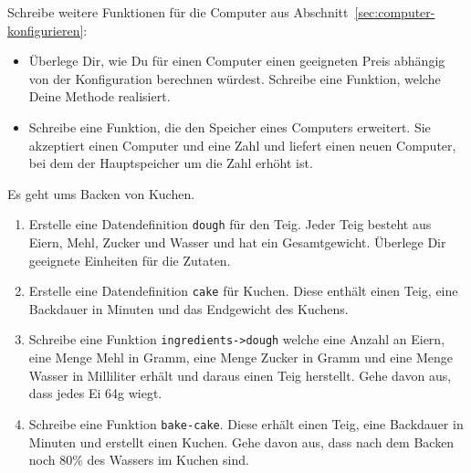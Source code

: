 \begin{aufgabe}

  Schreibe weitere Funktionen für die Computer aus Abschnitt~\ref{sec:computer-konfigurieren}:
  \begin{itemize}
  \item Überlege Dir, wie Du für einen Computer einen
    geeigneten Preis abhängig von der Konfiguration berechnen würdest.
    Schreibe eine Funktion, welche Deine Methode realisiert.
  \item Schreibe eine Funktion, die den Speicher eines Computers
    erweitert.  Sie akzeptiert einen Computer und eine Zahl und liefert
    einen neuen Computer, bei dem der Hauptspeicher um die Zahl erhöht
    ist.
  \end{itemize}
\end{aufgabe}

\begin{aufgabe}

  Es geht ums Backen von Kuchen.

  \begin{enumerate}
  \item Erstelle eine Datendefinition
    \lstinline{dough} für den Teig.  Jeder Teig besteht aus Eiern, Mehl,
    Zucker und Wasser und hat ein Gesamtgewicht.  Überlege Dir
    geeignete Einheiten für die Zutaten.
  \item Erstelle eine Datendefinition \lstinline{cake}
    für Kuchen.  Diese enthält einen Teig, eine Backdauer in Minuten und 
    das Endgewicht des Kuchens.
  \item Schreibe eine Funktion
    \lstinline{ingredients->dough} welche eine Anzahl an Eiern, eine
    Menge Mehl in Gramm, eine Menge Zucker in Gramm und eine
    Menge Wasser in Milliliter erhält und daraus einen Teig
    herstellt. Gehe davon aus, dass jedes Ei 64g wiegt.
  \item Schreibe eine Funktion \lstinline{bake-cake}. 
    Diese erhält einen Teig, eine Backdauer in Minuten und erstellt einen 
    Kuchen.  Gehe davon aus, dass nach dem Backen noch 80\% des
    Wassers im Kuchen sind.
  \end{enumerate}
  
\end{aufgabe}



